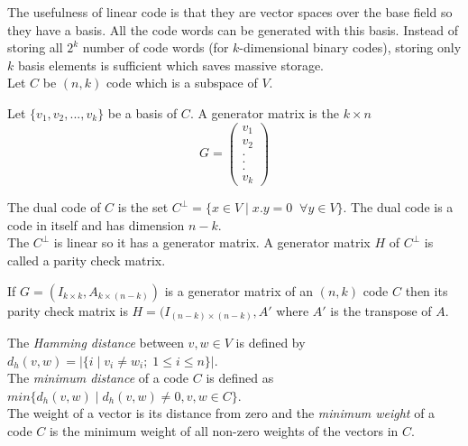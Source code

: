 The usefulness of linear code is that they are vector spaces over the base field so they have a basis. All the code words can be generated with this basis. Instead of storing all \(2^k\) number of code words (for \(k\)-dimensional binary codes), storing only \(k\) basis elements is sufficient which saves massive storage.\\[2mm]
Let \(C\) be \((n,k)\) code which is a subspace of \(V\).

\begin{definition}
  Let \(\{v_1, v_2,...,v_k\}\) be a basis of \(C\). A generator matrix is the \(k \times n\)
  \[G=\begin{pmatrix}
      v_1\\
      v_2\\
      .\\
      .\\
      .\\
      v_k
    \end{pmatrix}
  \]
\end{definition}
\vspace{2mm}

\begin{definition}
  The dual code of \(C\) is the set \(C^{\perp}=\{x \in V \;| \; x.y=0 \;\; \forall y \in V \}\). The dual code is a code in itself and has dimension \(n-k\).\\
  The \(C^{\perp}\) is linear so it has a generator matrix. A generator matrix \(H\) of \(C^{\perp}\) is called a parity check matrix.
\end{definition}

\begin{theorem}
  If \(G=(I_{k \times k},A_{k \times (n-k)})\) is a generator matrix of an \((n,k)\) code \(C\) then its parity check matrix is \(H=(I_{(n-k) \times (n-k)}, A'\) where \(A'\) is the transpose of \(A\).
\end{theorem}

\begin{definition}
  The \textit{Hamming distance} between \(v,w \in V\) is defined by \(d_h(v,w)=|\{i\;|\; v_i \neq w_i;\; 1 \leq i \leq n \}|\).\\
  The \textit{minimum distance} of a code \(C\) is defined as \(min\{d_h(v,w)\;|\; d_h(v,w) \neq 0, v,w \in C\}\).\\
  The weight of a vector is its distance from zero and the \textit{minimum weight} of a code \(C\) is the minimum weight of all non-zero weights of the vectors in \(C\).
\end{definition}

